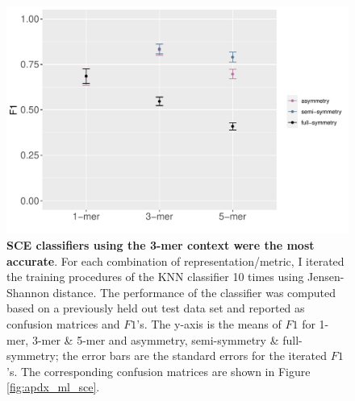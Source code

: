 \begin{figure}[h!]
    \includegraphics[scale=0.75]{graphics/f1_sce.pdf}
    \caption{\textbf{SCE classifiers using the 3-mer context  were the most accurate}. For each combination of representation/metric, I iterated the training procedures of the KNN classifier 10 times using Jensen-Shannon distance. The performance of the classifier was computed based on a previously held out test data set and reported as confusion matrices and $F1$'s. The y-axis is the means of $F1$ for 1-mer, 3-mer \& 5-mer and asymmetry, semi-symmetry \& full-symmetry; the error bars are the standard errors for the iterated $F1$’s. The corresponding confusion matrices are shown in Figure \ref{fig:apdx_ml_sce}.}
    \label{fig:f1_sce}
\end{figure}
